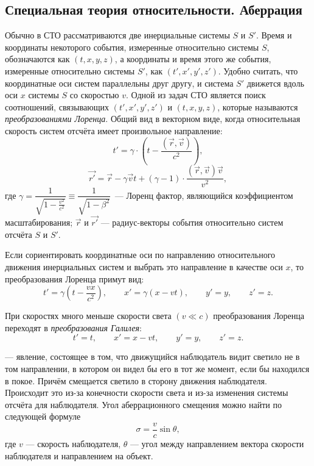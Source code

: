 \subsection{Специальная теория относительности. Аберрация}

Обычно в СТО рассматриваются две инерциальные системы $S$ и $S'$. Время и координаты некоторого события, измеренные относительно системы $S$, обозначаются как $(t, x, y, z)$, а координаты и время этого же события, измеренные относительно системы $S'$, как $(t', x', y', z')$. Удобно считать, что координатные оси систем параллельны друг другу, и система $S'$ движется вдоль оси $x$ системы $S$ со скоростью $v$. Одной из задач СТО является поиск соотношений, связывающих $(t', x', y', z')$ и $(t, x, y, z)$, которые называются \textit{преобразованиями Лоренца}. Общий вид  в векторном виде, когда относительная скорость систем отсчёта имеет произвольное направление:
\begin{equation}
t'=\gamma\cdot \left(t-\frac{(\vec{r},\vec{v})}{c^2}\right),
\end{equation}
\begin{equation}
\vec{r'} = \vec{r} - \gamma \vec{v} t + (\gamma - 1) \cdot \frac{(\vec{r},\vec{v})\vec{v}}{v^2},
\end{equation}
где  $\gamma = \dfrac{1}{\sqrt{1 - \frac{v^2}{c^2}}} \equiv \dfrac{1}{\sqrt{1-\beta^2}}$~--- Лоренц фактор, являющийся коэффициентом масштабирования; $\vec{r}$ и $\vec{r'}$ --- радиус-векторы события относительно систем отсчёта $S$ и $S'$.

Если сориентировать координатные оси по направлению относительного движения инерциальных систем и выбрать это направление в качестве оси $x$, то преобразования Лоренца примут вид: 
\begin{equation}
t'=\gamma \left(t - \frac{v x}{c^2} \right),\quad\quad x'= \gamma \left( x-vt \right), \quad\quad y'=y,\quad\quad z'=z.
\end{equation}

 При скоростях много меньше скорости света $(v\ll c)$ преобразования Лоренца переходят в \textit{преобразования Галилея}:
\begin{equation}
 t'=t,\quad\quad x'=x-vt,\quad\quad  y'=y,\quad\quad  z'=z.
\end{equation}
 
 --- явление, состоящее в том, что движущийся наблюдатель видит светило не в том направлении, в котором он видел бы его в тот же момент, если бы находился в покое. Причём смещается светило в сторону движения наблюдателя. Происходит это из-за конечности скорости света и из-за изменения системы отсчёта для наблюдателя.  
Угол аберрационного смещения можно найти по следующей формуле
\begin{equation}\sigma=\frac{v}{c}\sin\theta,
\end{equation}
где $v$ --- скорость наблюдателя, $\theta$ --- угол между направлением вектора скорости наблюдателя и направлением на объект. 